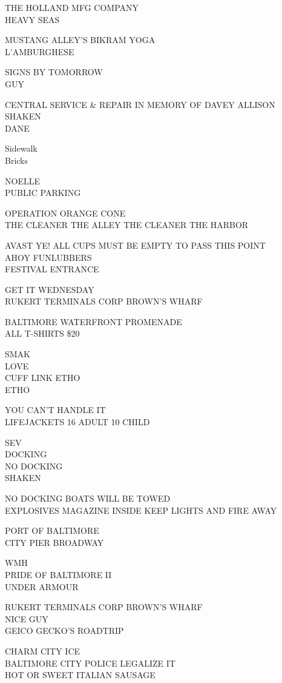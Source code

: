 \documentclass[10pt,letterpaper]{article}
\begin{document}
THE HOLLAND MFG COMPANY\\
HEAVY SEAS

MUSTANG ALLEY'S BIKRAM YOGA\\
L'AMBURGHESE

SIGNS BY TOMORROW\\
GUY

CENTRAL SERVICE \& REPAIR IN MEMORY OF DAVEY ALLISON\\
SHAKEN\\
DANE

Sidewalk\\
Bricks

NOELLE\\
PUBLIC PARKING

OPERATION ORANGE CONE\\
THE CLEANER THE ALLEY THE CLEANER THE HARBOR

AVAST YE! ALL CUPS MUST BE EMPTY TO PASS THIS POINT\\
AHOY FUNLUBBERS\\
FESTIVAL ENTRANCE

GET IT WEDNESDAY\\
RUKERT TERMINALS CORP BROWN'S WHARF

BALTIMORE WATERFRONT PROMENADE\\
ALL T{-}SHIRTS \$20

SMAK\\
LOVE\\
CUFF LINK ETHO\\
ETHO

YOU CAN'T HANDLE IT\\
LIFEJACKETS 16 ADULT 10 CHILD

SEV\\
DOCKING\\
NO DOCKING\\
SHAKEN

NO DOCKING BOATS WILL BE TOWED\\
EXPLOSIVES MAGAZINE INSIDE KEEP LIGHTS AND FIRE AWAY

PORT OF BALTIMORE\\
CITY PIER BROADWAY

WMH\\
PRIDE OF BALTIMORE II\\
UNDER ARMOUR

RUKERT TERMINALS CORP BROWN'S WHARF\\
NICE GUY\\
GEICO GECKO'S ROADTRIP

CHARM CITY ICE\\
BALTIMORE CITY POLICE LEGALIZE IT\\
HOT OR SWEET ITALIAN SAUSAGE
\end{document}
